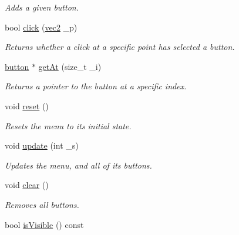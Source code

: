 \begin{DoxyCompactItemize}
\begin{DoxyCompactList}\small\item\em Adds a given button. \end{DoxyCompactList}\item 
bool \hyperlink{classui_1_1selection_a6ad3cac61fc06b2fa42e34414a451e5c}{click} (\hyperlink{structvec2}{vec2} \-\_\-p)
\begin{DoxyCompactList}\small\item\em Returns whether a click at a specific point has selected a button. \end{DoxyCompactList}\item 
\hyperlink{classui_1_1button}{button} $\ast$ \hyperlink{classui_1_1selection_a7115901e3bccf2124257e4940325eae9}{get\-At} (size\-\_\-t \-\_\-i)
\begin{DoxyCompactList}\small\item\em Returns a pointer to the button at a specific index. \end{DoxyCompactList}\item 
\hypertarget{classui_1_1selection_a3722c2936a44bafaa7b9cd384e99cd38}{void \hyperlink{classui_1_1selection_a3722c2936a44bafaa7b9cd384e99cd38}{reset} ()}\label{classui_1_1selection_a3722c2936a44bafaa7b9cd384e99cd38}

\begin{DoxyCompactList}\small\item\em Resets the menu to its initial state. \end{DoxyCompactList}\item 
void \hyperlink{classui_1_1selection_ad5a4ebe39592a9c3f0ba0466cefd2dc3}{update} (int \-\_\-s)
\begin{DoxyCompactList}\small\item\em Updates the menu, and all of its buttons. \end{DoxyCompactList}\item 
\hypertarget{classui_1_1selection_a5b36fe0d746308833ef47577d15836c3}{void \hyperlink{classui_1_1selection_a5b36fe0d746308833ef47577d15836c3}{clear} ()}\label{classui_1_1selection_a5b36fe0d746308833ef47577d15836c3}

\begin{DoxyCompactList}\small\item\em Removes all buttons. \end{DoxyCompactList}\item 
\hypertarget{classui_1_1selection_ac9eea8598aafeef507019e0ce7195cee}{bool \hyperlink{classui_1_1selection_ac9eea8598aafeef507019e0ce7195cee}{is\-Visible} () const }\label{classui_1_1selection_ac9eea8598aafeef507019e0ce7195cee}


\end{DoxyCompactItemize}
